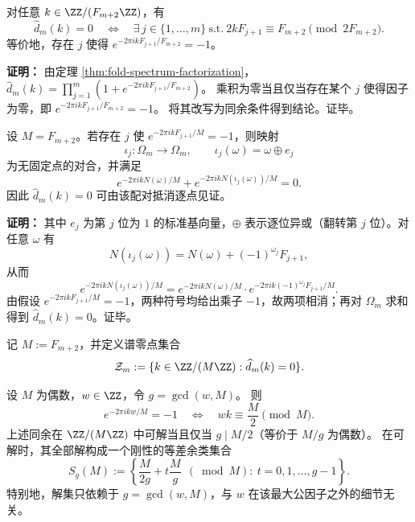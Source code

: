 \begin{theorem}[谱零点的同余判别]
\label{thm:fold-spectrum-zero-criterion}
对任意 $k\in\ZZ/(F_{m+2}\ZZ)$，有
\[
\widehat d_m(k)=0\quad\Longleftrightarrow\quad\exists\,j\in\{1,\dots,m\}\ \text{s.t.}\ 2kF_{j+1}\equiv F_{m+2}\pmod{2F_{m+2}}.
\]
等价地，存在 $j$ 使得
\(
e^{-2\pi i k F_{j+1}/F_{m+2}}=-1
\)。
\end{theorem}

\textbf{证明：}
由定理 \ref{thm:fold-spectrum-factorization}，
\(
\widehat d_m(k)=\prod_{j=1}^m(1+e^{-2\pi i k F_{j+1}/F_{m+2}})
\)。
乘积为零当且仅当存在某个 $j$ 使得因子为零，即
\(
e^{-2\pi i k F_{j+1}/F_{m+2}}=-1
\)。
将其改写为同余条件得到结论。证毕。

\begin{corollary}\label{cor:fold-spectrum-zero-involution}
设 $M=F_{m+2}$。若存在 $j$ 使 $e^{-2\pi i k F_{j+1}/M}=-1$，则映射
\[
\iota_j:\Omega_m\to\Omega_m,\qquad \iota_j(\omega)=\omega\oplus e_j
\]
为无固定点的对合，并满足
\[
e^{-2\pi i k N(\omega)/M}+e^{-2\pi i k N(\iota_j(\omega))/M}=0.
\]
因此 $\widehat d_m(k)=0$ 可由该配对抵消逐点见证。
\end{corollary}

\textbf{证明：}
其中 $e_j$ 为第 $j$ 位为 $1$ 的标准基向量，$\oplus$ 表示逐位异或（翻转第 $j$ 位）。对任意 $\omega$ 有
\[
N(\iota_j(\omega))=N(\omega)+(-1)^{\omega_j}F_{j+1},
\]
从而
\[
e^{-2\pi i k N(\iota_j(\omega))/M}
=e^{-2\pi i k N(\omega)/M}\cdot e^{-2\pi i k(-1)^{\omega_j}F_{j+1}/M}.
\]
由假设 $e^{-2\pi i k F_{j+1}/M}=-1$，两种符号均给出乘子 $-1$，故两项相消；再对 $\Omega_m$ 求和得到 $\widehat d_m(k)=0$。证毕。

\begin{definition}[谱零点集合]\label{def:fold-spectrum-zero-set}
记 \(M:=F_{m+2}\)，并定义谱零点集合
\[
\mathcal{Z}_m:=\{k\in\ZZ/(M\ZZ):\widehat d_m(k)=0\}.
\]
\end{definition}

\begin{theorem}\label{thm:fold-zero-coset-rigidity}
设 \(M\) 为偶数，\(w\in\ZZ\)，令 \(g=\gcd(w,M)\)。
则
\[
e^{-2\pi i k w/M}=-1
\quad\Longleftrightarrow\quad
wk\equiv \frac{M}{2}\pmod M.
\]
上述同余在 \(\ZZ/(M\ZZ)\) 中可解当且仅当 \(g\mid M/2\)（等价于 \(M/g\) 为偶数）。
在可解时，其全部解构成一个刚性的等差余类集合
\[
S_g(M):=\left\{\frac{M}{2g}+t\frac{M}{g}\ \ (\bmod M):\ t=0,1,\dots,g-1\right\}.
\]
特别地，解集只依赖于 \(g=\gcd(w,M)\)，与 \(w\) 在该最大公因子之外的细节无关。
\end{theorem}

